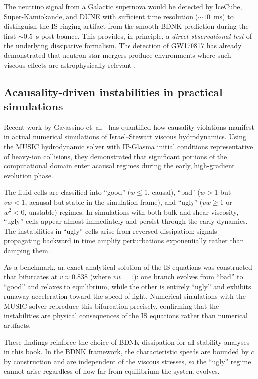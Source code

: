 The neutrino signal from a Galactic supernova would be detected by
IceCube, Super-Kamiokande, and DUNE with sufficient time resolution
($\sim 10$~ms) to distinguish the IS ringing artifact from the smooth
BDNK prediction during the first $\sim 0.5$~s post-bounce.  This
provides, in principle, a \emph{direct observational test} of the
underlying dissipative formalism.  The detection of GW170817
\cite{DR11_Abbott2017GW170817} has already demonstrated that neutron star
mergers produce environments where such viscous effects are
astrophysically relevant \cite{DR11_MostPapenfort2019}.

\subsection{Acausality-driven instabilities in practical simulations}

Recent work by Gavassino et~al.\
\citep{GavassinoCausalityHIC2025,GavassinoAcausalityIS2025} has
quantified how causality violations manifest in actual numerical
simulations of Israel--Stewart viscous hydrodynamics.  Using the MUSIC
hydrodynamic solver with IP-Glasma initial conditions representative
of heavy-ion collisions, they demonstrated that significant portions
of the computational domain enter acausal regimes during the early,
high-gradient evolution phase.

The fluid cells are classified into ``good'' ($w \le 1$, causal),
``bad'' ($w > 1$ but $vw < 1$, acausal but stable in the simulation
frame), and ``ugly'' ($vw \ge 1$ or $w^{2} < 0$, unstable) regimes.
In simulations with both bulk and shear viscosity, ``ugly'' cells
appear almost immediately and persist through the early dynamics.
The instabilities in ``ugly'' cells arise from reversed dissipation:
signals propagating backward in time amplify perturbations
exponentially rather than damping them.

As a benchmark, an exact analytical solution of the IS equations was
constructed that bifurcates at $v \approx 0.838$ (where $vw = 1$):
one branch evolves from ``bad'' to ``good'' and relaxes to
equilibrium, while the other is entirely ``ugly'' and exhibits
runaway acceleration toward the speed of light.  Numerical
simulations with the MUSIC solver reproduce this bifurcation
precisely, confirming that the instabilities are physical consequences
of the IS equations rather than numerical artifacts.

These findings reinforce the choice of BDNK dissipation for all
stability analyses in this book.  In the BDNK framework, the
characteristic speeds are bounded by $c$ by construction and are
independent of the viscous stresses, so the ``ugly'' regime cannot
arise regardless of how far from equilibrium the system evolves.
